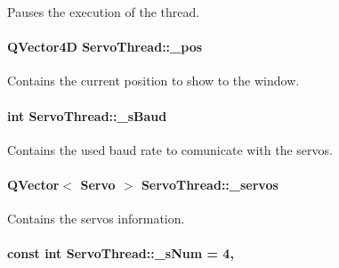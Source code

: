 Pauses the execution of the thread. 

\hypertarget{a00009_a6ad7cef9e9ac7454399871260e3693d4}{}
\paragraph[{\+\_\+pos}]{\setlength{\rightskip}{0pt plus 5cm}Q\+Vector4\+D Servo\+Thread\+::\+\_\+pos\hspace{0.3cm}{\ttfamily [private]}}\label{a00009_a6ad7cef9e9ac7454399871260e3693d4}


Contains the current position to show to the window. 

\hypertarget{a00009_a5b9a41b9e271275b914affb0a845a2ee}{}
\paragraph[{\+\_\+s\+Baud}]{\setlength{\rightskip}{0pt plus 5cm}int Servo\+Thread\+::\+\_\+s\+Baud\hspace{0.3cm}{\ttfamily [private]}}\label{a00009_a5b9a41b9e271275b914affb0a845a2ee}


Contains the used baud rate to comunicate with the servos. 

\hypertarget{a00009_a1ac6662fe6d198b5971ae0ffa7ddfcfd}{}
\paragraph[{\+\_\+servos}]{\setlength{\rightskip}{0pt plus 5cm}Q\+Vector$<$ {\bf Servo} $>$ Servo\+Thread\+::\+\_\+servos\hspace{0.3cm}{\ttfamily [private]}}\label{a00009_a1ac6662fe6d198b5971ae0ffa7ddfcfd}


Contains the servos information. 

\hypertarget{a00009_a334e0c5bca9ccb2585cb82bce60ea42f}{}
\paragraph[{\+\_\+s\+Num}]{\setlength{\rightskip}{0pt plus 5cm}const int Servo\+Thread\+::\+\_\+s\+Num = 4\hspace{0.3cm}{\ttfamily [static]}, {\ttfamily [private]}}\label{a00009_a334e0c5bca9ccb2585cb82bce60ea42f}


